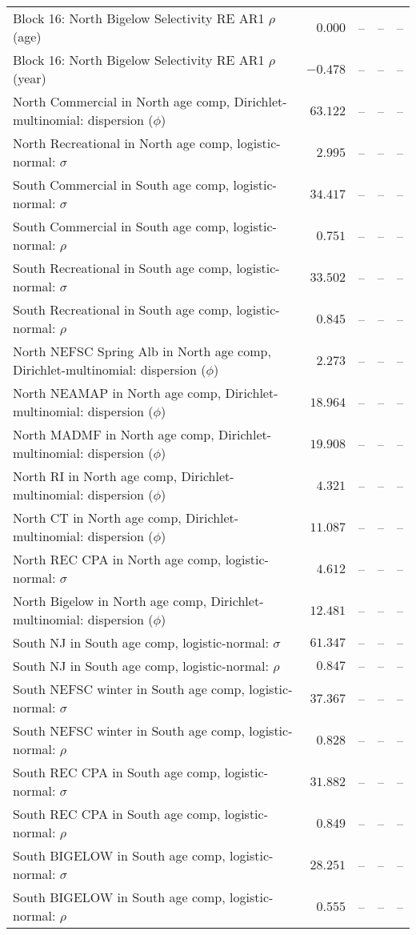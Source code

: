 \documentclass[
]{article}
\begin{document}
\begin{landscape}
\begin{longtable}[t]{lrrrr}
Block 16: North Bigelow Selectivity RE AR1 $\rho$ (age) & $0.000$ & -- & -- & --\\
\addlinespace
Block 16: North Bigelow Selectivity RE AR1 $\rho$ (year) & $-0.478$ & -- & -- & --\\
North Commercial in North age comp, Dirichlet-multinomial: dispersion ($\phi$) & $63.122$ & -- & -- & --\\
North Recreational in North age comp, logistic-normal: $\sigma$ & $2.995$ & -- & -- & --\\
South Commercial in South age comp, logistic-normal: $\sigma$ & $34.417$ & -- & -- & --\\
South Commercial in South age comp, logistic-normal: $\rho$ & $0.751$ & -- & -- & --\\
\addlinespace
South Recreational in South age comp, logistic-normal: $\sigma$ & $33.502$ & -- & -- & --\\
South Recreational in South age comp, logistic-normal: $\rho$ & $0.845$ & -- & -- & --\\
North NEFSC Spring Alb in North age comp, Dirichlet-multinomial: dispersion ($\phi$) & $2.273$ & -- & -- & --\\
North NEAMAP in North age comp, Dirichlet-multinomial: dispersion ($\phi$) & $18.964$ & -- & -- & --\\
North MADMF in North age comp, Dirichlet-multinomial: dispersion ($\phi$) & $19.908$ & -- & -- & --\\
\addlinespace
North RI in North age comp, Dirichlet-multinomial: dispersion ($\phi$) & $4.321$ & -- & -- & --\\
North CT in North age comp, Dirichlet-multinomial: dispersion ($\phi$) & $11.087$ & -- & -- & --\\
North REC CPA in North age comp, logistic-normal: $\sigma$ & $4.612$ & -- & -- & --\\
North Bigelow in North age comp, Dirichlet-multinomial: dispersion ($\phi$) & $12.481$ & -- & -- & --\\
South NJ in South age comp, logistic-normal: $\sigma$ & $61.347$ & -- & -- & --\\
\addlinespace
South NJ in South age comp, logistic-normal: $\rho$ & $0.847$ & -- & -- & --\\
South NEFSC winter in South age comp, logistic-normal: $\sigma$ & $37.367$ & -- & -- & --\\
South NEFSC winter in South age comp, logistic-normal: $\rho$ & $0.828$ & -- & -- & --\\
South REC CPA in South age comp, logistic-normal: $\sigma$ & $31.882$ & -- & -- & --\\
South REC CPA in South age comp, logistic-normal: $\rho$ & $0.849$ & -- & -- & --\\
\addlinespace
South BIGELOW in South age comp, logistic-normal: $\sigma$ & $28.251$ & -- & -- & --\\
South BIGELOW in South age comp, logistic-normal: $\rho$ & $0.555$ & -- & -- & --\\*
\end{longtable}
\end{landscape}
\end{document}
